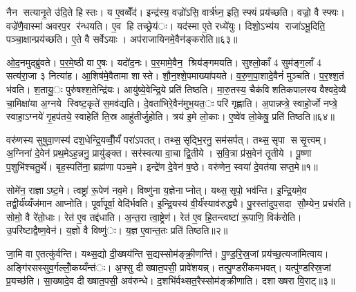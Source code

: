 नैन सत्यानृ॒ते उ॑दि॒ते हिस्तः। य ए॒वव्वेँद॑। इन्द्र॑स्य॒ वज्रो॑ऽसि॒ वार्त्र॑घ्न॒ इति॒ स्फ्यं प्रय॑च्छति। वज्रो॒ वै स्फ्यः। वज्रे॑णै॒वास्मा॑ अवरप॒र र॑न्धयति। ए॒व हि तच्छ्रेय॑ः। यद॑स्मा ए॒ते रध्ये॑युः। दिशो॒ऽभ्य॑य राजा॑ऽभू॒दिति॒ पञ्चा॒क्षान्प्रय॑च्छति। ए॒ते वै सर्वेऽयाः। अप॑राजायिनमे॒वैन॑ङ्करोति॥६३॥

ओ॒द॒नमुद्ब्रु॑वते। प॒र॒मे॒ष्ठी वा ए॒षः। यदो॑द॒नः। प॒र॒मामे॒वैन॒ श्रिय॑ङ्गमयति। सुश्लो॒काँ 4 सुम॑ङ्ग॒लाँ 4 सत्य॑रा॒जा ३ नित्या॑ह। आ॒शिष॑मे॒वैतामा शास्ते। शौ॒न॒श्शे॒पमाख्या॑पयते। व॒रु॒ण॒पा॒शादे॒वैनं॑ मुञ्चति। प॒र॒श्श॒तं भ॑वति। श॒तायु॒ः पुरु॑षश्श॒तेन्द्रि॑यः। आयु॑ष्ये॒वेन्द्रि॒ये प्रति॑ तिष्ठति। मा॒रु॒तस्य॒ चैक॑विशतिकपालस्य वैश्वदे॒व्यै चा॒मिक्षा॑या अ॒ग्नये स्विष्ट॒कृते॑ स॒मव॑द्यति। दे॒वता॑भिरे॒वैन॑मुभ॒यत॒ः परि॑ गृह्णाति। अ॒पान्नप्त्रे॒ स्वाहो॒र्जो नप्त्रे॒ स्वाहा॒ऽग्नये॑ गृ॒हप॑तये॒ स्वाहेति॑ ति॒स्र आहु॑तीर्जुहोति। त्रय॑ इ॒मे लो॒काः। ए॒ष्वे॑व लो॒केषु॒ प्रति॑ तिष्ठति॥६४॥




वरु॑णस्य सुषुवा॒णस्य॑ दश॒धेन्द्रि॒यव्वीँ॒र्यं॑ परा॑ऽपतत्। तथ्स॒सृद्भि॒रनु॒ सम॑सर्पत्। तथ्स॒सृपा ससृ॒त्त्वम्। अ॒ग्निना॑ दे॒वेन॑ प्रथ॒मेऽह॒न्ननु॒ प्रायु॑ङ्क्त। सर॑स्वत्या वा॒चा द्वि॒तीये। स॒वि॒त्रा प्र॑स॒वेन॑ तृ॒तीये। पू॒ष्णा प॒शुभि॑श्चतु॒र्थे। बृह॒स्पति॑ना॒ ब्रह्म॑णा पञ्च॒मे। इन्द्रे॑ण दे॒वेन॑ ष॒ष्ठे। वरु॑णेन॒ स्वया॑ दे॒वत॑या सप्त॒मे॥१॥

सोमे॑न॒ राज्ञाऽष्ट॒मे। त्वष्ट्रा॑ रू॒पेण॑ नव॒मे। विष्णु॑ना य॒ज्ञेनाप्नोत्। यथ्स॒सृपो॒ भव॑न्ति। इ॒न्द्रि॒यमे॒व तद्वी॒र्य॑य्यँज॑मान आप्नोति। पूर्वा॑पूर्वा॒ वेदि॑र्भवति। इ॒न्द्रि॒यस्य॑ वी॒र्य॑स्याव॑रुद्ध्यै। पु॒रस्ता॑दुप॒सदा सौ॒म्येन॒ प्रच॑रति। सोमो॒ वै रे॑तो॒धाः। रेत॑ ए॒व तद्द॑धाति। अ॒न्त॒रा त्वा॒ष्ट्रेण॑। रेत॑ ए॒व हि॒तन्त्वष्टा॑ रू॒पाणि॒ विक॑रोति। उ॒परि॑ष्टाद्वैष्ण॒वेन॑। य॒ज्ञो वै विष्णु॑ः। य॒ज्ञ ए॒वान्त॒तः प्रति॑ तिष्ठति॥२॥


जा॒मि वा ए॒तत्कु॑र्वन्ति। यथ्स॒द्यो दी॒ख्षय॑न्ति स॒द्यस्सोम॑ङ्क्री॒णन्ति॑। पु॒ण्ड॒रि॒स्र॒जां प्रय॑च्छ॒त्यजा॑मित्वाय। अङ्गि॑रसस्सुव॒र्गल्लोँ॒कय्यँन्त॑ः। अ॒फ्सु दीख्षात॒पसी॒ प्रावे॑शयन्न्। तत्पु॒ण्डरी॑कमभवत्। यत्पु॑ण्डरिस्र॒जां प्र॒यच्छ॑ति। सा॒ख्षादे॒व दीख्षात॒पसी॒ अव॑रुन्धे। द॒शभि॑र्वथ्सत॒रैस्सोम॑ङ्क्रीणाति। दशाख्षरा वि॒राट्॥३॥

